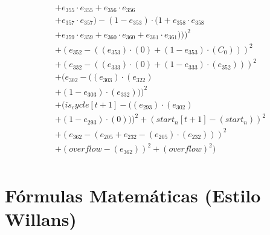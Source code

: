 \documentclass[10pt, a4paper]{article}
\begin{document}
\begin{small}
\begin{align*}
& + e_{355} \cdot e_{355} + e_{356} \cdot e_{356} \\
& + e_{357} \cdot e_{357}) - (1 - e_{353}) \cdot (1 + e_{358} \cdot e_{358} \\
& + e_{359} \cdot e_{359} + e_{360} \cdot e_{360} + e_{361} \cdot e_{361})))^{2} \\
& + (e_{352} - ((e_{353})  \cdot  (0) + (1 - e_{353})  \cdot  (C_{0})))^{2} \\
& + (e_{332} - ((e_{333})  \cdot  (0) + (1 - e_{333})  \cdot  (e_{352})))^{2} \\
& + (e_{302} - ((e_{303})  \cdot  (e_{322}) \\
& + (1 - e_{303})  \cdot  (e_{332})))^{2} \\
& + (is_cycle[t+1] - ((e_{293})  \cdot  (e_{302}) \\
& + (1 - e_{293})  \cdot  (0)))^{2} + (start_n[t+1] - (start_n))^{2} \\
& + (e_{362} - (e_{205} + e_{232} - (e_{205}) \cdot (e_{232})))^{2} \\
& + (overflow - (e_{362}))^{2} + (overflow)^{2}) \\
\end{align*}
\end{small}\part{Fórmulas Matemáticas (Estilo Willans)}
\end{document}
